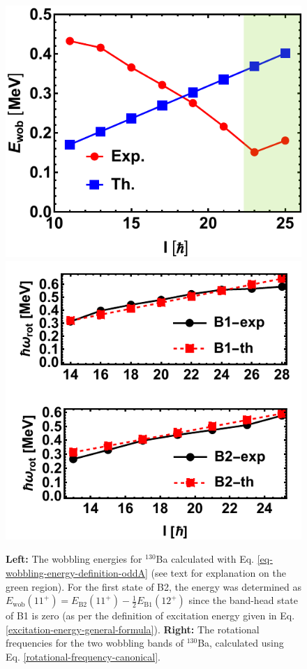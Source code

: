 \begin{figure}
    \centering
    \includegraphics[scale=0.8]{Chapters/Figures/ba130-wobbling-energies-edited.pdf}
    \includegraphics[scale=0.75]{Chapters/Figures/ba130-rotational-frequencies.pdf}
    \caption{\textbf{Left:} The wobbling energies for $^{130}$Ba calculated with Eq. \ref{eq-wobbling-energy-definition-oddA} (see text for explanation on the green region). For the first state of B2, the energy was determined as $E_\text{wob}(11^+)=E_\text{B2}(11^+)-\frac{1}{2}E_\text{B1}(12^+)$ since the band-head state of B1 is zero (as per the definition of excitation energy given in Eq. \ref{excitation-energy-general-formula}). \textbf{Right:} The rotational frequencies for the two wobbling bands of $^{130}$Ba, calculated using Eq. \ref{rotational-frequency-canonical}.}
    \label{wobbling-energies-130ba-expVSth}
\end{figure}

